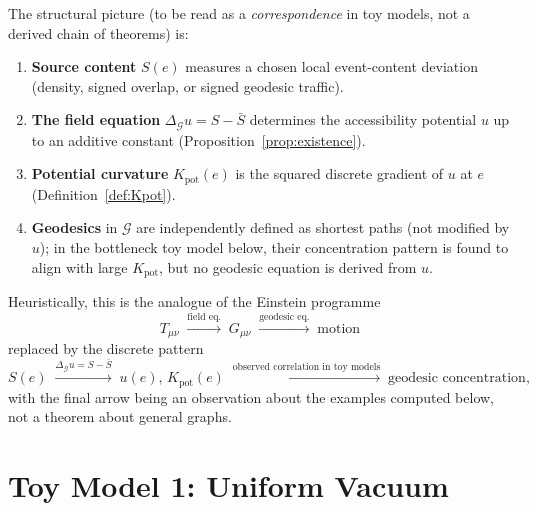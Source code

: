 \documentclass[12pt]{article}
\newcommand{\Gcal}{\mathcal{G}}
\begin{document}
The structural picture (to be read as a \emph{correspondence} in toy models, not a derived chain of theorems) is:
\begin{enumerate}
    \item \textbf{Source content} $S(e)$ measures a chosen local event-content deviation (density, signed overlap, or signed geodesic traffic).
    \item \textbf{The field equation} $\Delta_\Gcal u = S - \bar{S}$ determines the accessibility potential $u$ up to an additive constant (Proposition~\ref{prop:existence}).
    \item \textbf{Potential curvature} $K_{\mathrm{pot}}(e)$ is the squared discrete gradient of $u$ at $e$ (Definition~\ref{def:Kpot}).
    \item \textbf{Geodesics} in $\Gcal$ are independently defined as shortest paths (not modified by $u$); in the bottleneck toy model below, their concentration pattern is found to align with large $K_{\mathrm{pot}}$, but no geodesic equation is derived from $u$.
\end{enumerate}

Heuristically, this is the analogue of the Einstein programme
\[
    T_{\mu\nu} \;\xrightarrow{\text{field eq.}}\; G_{\mu\nu} \;\xrightarrow{\text{geodesic eq.}}\; \text{motion}
\]
replaced by the discrete pattern
\[
    S(e) \;\xrightarrow{\Delta_\Gcal u = S - \bar{S}}\; u(e),\, K_{\mathrm{pot}}(e) \;\xrightarrow{\text{observed correlation in toy models}}\; \text{geodesic concentration},
\]
with the final arrow being an observation about the examples computed below, not a theorem about general graphs.

\section{Toy Model 1: Uniform Vacuum}\label{sec:vacuum}
\end{document}
